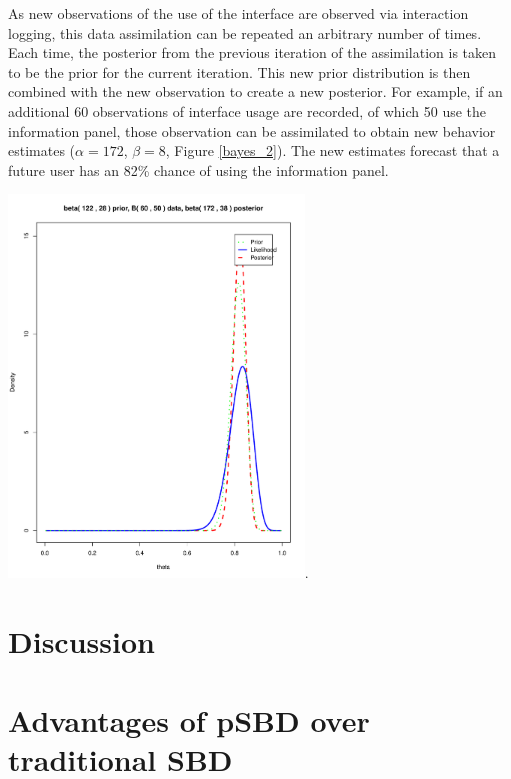 \documentclass[]{article}
\begin{document}
As new observations of the use of the interface are observed via
interaction logging, this data assimilation can be repeated an arbitrary
number of times. Each time, the posterior from the previous iteration of
the assimilation is taken to be the prior for the current iteration.
This new prior distribution is then combined with the new observation to
create a new posterior. For example, if an additional 60 observations of
interface usage are recorded, of which 50 use the information panel,
those observation can be assimilated to obtain new behavior estimates
(\(\alpha=172\), \(\beta=8\), Figure \ref{bayes_2}). The new estimates
forecast that a future user has an 82\% chance of using the information
panel.

\includegraphics[height=4.00000in]{./iter_2_posterior.pdf}.

\section{Discussion}\label{discussion}

\section{Advantages of pSBD over traditional
SBD}\label{advantages-of-psbd-over-traditional-sbd}
\end{document}
